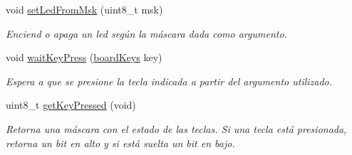 \begin{DoxyCompactItemize}
void \hyperlink{group__hardware_ga4b6495dfec1dcc97e48043d7bca4da60}{set\+Led\+From\+Msk} (uint8\+\_\+t msk)
\begin{DoxyCompactList}\small\item\em Enciend o apaga un led según la máscara dada como argumento. \end{DoxyCompactList}\item 
void \hyperlink{group__hardware_ga3ac24a1bb2d63482077813f22c6930a1}{wait\+Key\+Press} (\hyperlink{group__hardware_ga8d70125ca4047f0f7ea513cd8568953d}{board\+Keys} key)
\begin{DoxyCompactList}\small\item\em Espera a que se presione la tecla indicada a partir del argumento utilizado. \end{DoxyCompactList}\item 
uint8\+\_\+t \hyperlink{group__hardware_gabe9050eab201da85d14532c4d009603a}{get\+Key\+Pressed} (void)
\begin{DoxyCompactList}\small\item\em Retorna una máscara con el estado de las teclas. Si una tecla está presionada, retorna un bit en alto y si está suelta un bit en bajo. \end{DoxyCompactList}\end{DoxyCompactItemize}
